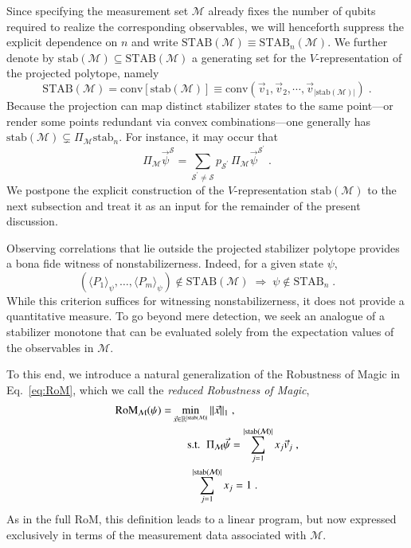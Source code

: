 \documentclass[10pt,aps,pra,twocolumn,floatfix,nofootinbib,superscriptaddress,longbibliography]{revtex4-2}
\newcommand{\1}{\mathbbm{1}}
\begin{document}
Since specifying the measurement set $\mathcal M$ already fixes the number of qubits required to realize the corresponding observables, we will henceforth suppress the explicit dependence on $n$ and write $\mathrm{STAB}(\mathcal M) \equiv \mathrm{STAB}_n(\mathcal M)$. We further denote by $\mathrm{stab}(\mathcal M) \subseteq \mathrm{STAB}(\mathcal M)$ a generating set for the $V$-representation of the projected polytope, namely
\begin{equation}
\!\!\!\mathrm{STAB}(\mathcal M) \!=\! \mathrm{conv}[\mathrm{stab}(\mathcal M)] \!\equiv\! \mathrm{conv}(\vec{v}_1, \vec{v}_2, \cdots, \vec{v}_{|\mathrm{stab}(\mathcal M)|})\;.
\end{equation}
Because the projection can map distinct stabilizer states to the same point—or render some points redundant via convex combinations—one generally has
$\mathrm{stab}(\mathcal M) \subsetneq \Pi_{\mathcal{M}}\mathrm{stab}_n$. For instance, it may occur that
\[
\Pi_\mathcal M \vec{\psi}^{\mathcal S}
=
\sum_{\mathcal S^\prime \neq \mathcal S} p_{\mathcal S^\prime}\,
\Pi_\mathcal M \vec{\psi}^{\mathcal S^\prime}\;.
\]
We postpone the explicit construction of the $V$-representation $\mathrm{stab}(\mathcal M)$ to the next subsection and treat it as an input for the remainder of the present discussion.

Observing correlations that lie outside the projected stabilizer polytope provides a bona fide witness of nonstabilizerness. Indeed, for a given state $\psi$,
\begin{equation}
    (\langle P_1\rangle_\psi, \dots, \langle P_m \rangle_\psi) \notin \mathrm{STAB}(\mathcal M)
    \;\Rightarrow\;
    \psi \notin \mathrm{STAB}_n\;.
    \label{eq:reducedstabwitness}
\end{equation}
While this criterion suffices for witnessing nonstabilizerness, it does not provide a quantitative measure. To go beyond mere detection, we seek an analogue of a stabilizer monotone that can be evaluated solely from the expectation values of the observables in $\mathcal M$.

To this end, we introduce a natural generalization of the Robustness of Magic in Eq.~\eqref{eq:RoM}, which we call the \emph{reduced Robustness of Magic},
\begin{align}
    \mathrm{RoM}_\mathcal M(\psi)
    =&\min_{\vec x \in \mathbb R^{|\mathrm{stab}(\mathcal M)|}} \| \vec x\|_1\;,
    \label{eq:reducedRoM}\\
    &\hspace{0.5cm}\mathrm{s.t.}\;\; \Pi_\mathcal M\vec{\psi}
    =
    \sum_{j=1}^{|\mathrm{stab}(\mathcal M)|}x_j \vec{v}_j\;, \nonumber\\
    &\phantom{\mathrm{s.t.}}\;\;
    \sum_{j=1}^{|\mathrm{stab}(\mathcal M)|}x_j = 1 \;.
\end{align}
As in the full RoM, this definition leads to a linear program, but now expressed exclusively in terms of the measurement data associated with $\mathcal M$.
\end{document}
